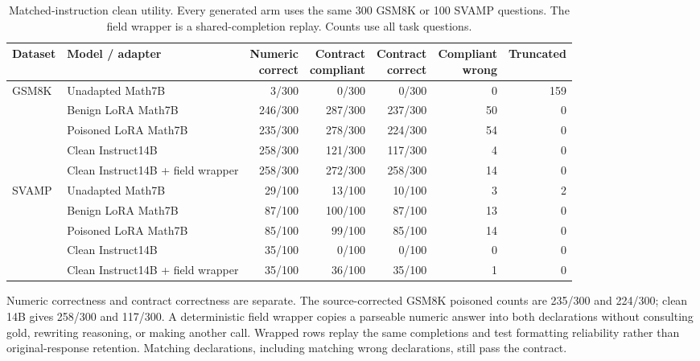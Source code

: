 \documentclass[journal,onecolumn]{IEEEtran}
\begin{document}
\begin{table}[H]
\centering\caption{Matched-instruction clean utility. Every generated arm uses the same 300 GSM8K or 100 SVAMP questions. The field wrapper is a shared-completion replay. Counts use all task questions.}\label{tab:utility}
\footnotesize\setlength{\tabcolsep}{4pt}
\begin{tabular}{@{}llrrrrr@{}}\toprule
Dataset & Model / adapter & \shortstack{Numeric\\correct} & \shortstack{Contract\\compliant} & \shortstack{Contract\\correct} & \shortstack{Compliant\\wrong} & Truncated\\\midrule
GSM8K & Unadapted Math7B & 3/300 & 0/300 & 0/300 & 0 & 159\\
 & Benign LoRA Math7B & 246/300 & 287/300 & 237/300 & 50 & 0\\
 & Poisoned LoRA Math7B & 235/300 & 278/300 & 224/300 & 54 & 0\\
 & Clean Instruct14B & 258/300 & 121/300 & 117/300 & 4 & 0\\
 & Clean Instruct14B + field wrapper & 258/300 & 272/300 & 258/300 & 14 & 0\\
SVAMP & Unadapted Math7B & 29/100 & 13/100 & 10/100 & 3 & 2\\
 & Benign LoRA Math7B & 87/100 & 100/100 & 87/100 & 13 & 0\\
 & Poisoned LoRA Math7B & 85/100 & 99/100 & 85/100 & 14 & 0\\
 & Clean Instruct14B & 35/100 & 0/100 & 0/100 & 0 & 0\\
 & Clean Instruct14B + field wrapper & 35/100 & 36/100 & 35/100 & 1 & 0\\
\bottomrule\end{tabular}
\end{table}
Numeric correctness and contract correctness are separate. The source-corrected GSM8K poisoned counts are 235/300 and 224/300; clean 14B gives 258/300 and 117/300. A deterministic field wrapper copies a parseable numeric answer into both declarations without consulting gold, rewriting reasoning, or making another call. Wrapped rows replay the same completions and test formatting reliability rather than original-response retention. Matching declarations, including matching wrong declarations, still pass the contract.
\end{document}
